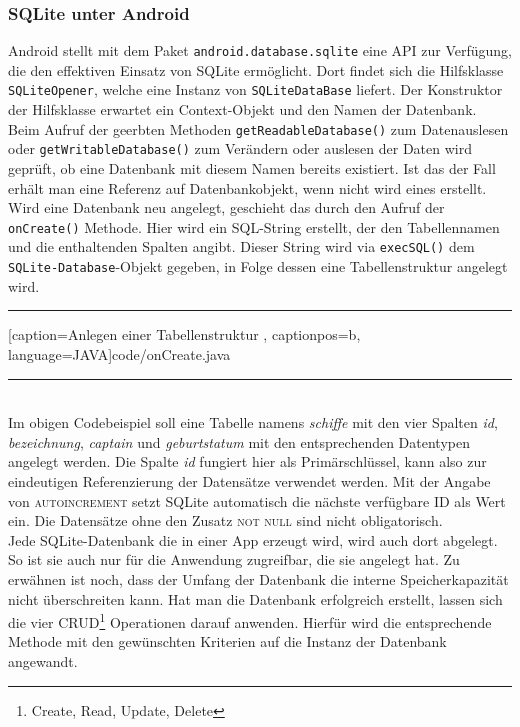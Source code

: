\subsubsection{SQLite unter Android}
Android stellt mit dem Paket \texttt{android.database.sqlite} eine \gls{API} zur Verfügung, die den effektiven Einsatz von SQLite ermöglicht. Dort findet sich die Hilfsklasse \texttt{SQLiteOpener}, welche eine Instanz von \texttt{SQLiteDataBase} liefert. Der Konstruktor der Hilfsklasse erwartet ein Context-Objekt und den Namen der Datenbank. Beim Aufruf der geerbten Methoden \texttt{getReadableDatabase()} zum Datenauslesen oder \texttt{getWritableDatabase()} zum Verändern oder auslesen der Daten wird geprüft, ob eine Datenbank mit diesem Namen bereits existiert. Ist das der Fall erhält man eine Referenz auf Datenbankobjekt, wenn nicht wird eines erstellt.\\
Wird eine Datenbank neu angelegt, geschieht das durch den Aufruf der \texttt{onCreate()} Methode. Hier wird ein \gls{SQL}-String erstellt, der den Tabellennamen und die enthaltenden Spalten angibt. Dieser String wird via \texttt{execSQL()} dem \texttt{SQLite-Database}-Objekt gegeben, in Folge dessen eine Tabellenstruktur angelegt wird.\\
\rule{35em}{0.5pt}

[caption={Anlegen einer Tabellenstruktur}
\label{code:onCreate}, captionpos=b, language=JAVA]{code/onCreate.java}
\rule{35em}{0.5pt}\\
 Im obigen Codebeispiel soll eine Tabelle namens \textit{schiffe} mit den vier Spalten \textit{id}, \textit{bezeichnung}, \textit{captain} und \textit{geburtstatum} mit den entsprechenden Datentypen angelegt werden. Die Spalte \textit{id} fungiert hier als Primärschlüssel, kann also zur eindeutigen Referenzierung der Datensätze verwendet werden. Mit der Angabe von \textsc{autoincrement} setzt SQLite automatisch die nächste verfügbare ID als Wert ein. Die Datensätze ohne den Zusatz \textsc{not null} sind nicht obligatorisch.\\
Jede SQLite-Datenbank die in einer \gls{App} erzeugt wird, wird auch dort abgelegt. So ist sie auch nur für die Anwendung zugreifbar, die sie angelegt hat. Zu erwähnen ist noch, dass der Umfang der Datenbank die interne Speicherkapazität nicht überschreiten kann. Hat man die Datenbank erfolgreich erstellt, lassen sich die vier CRUD\footnote{ Create, Read, Update, Delete} Operationen darauf anwenden. Hierfür wird die entsprechende Methode mit den gewünschten Kriterien auf die Instanz der Datenbank angewandt.
